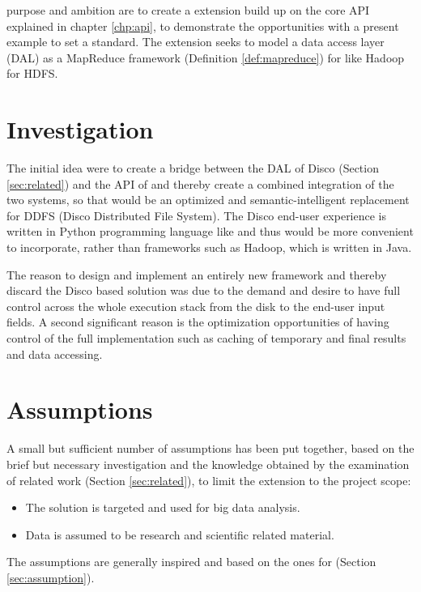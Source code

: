  purpose and ambition are to create a \CodeName extension build up on the core API explained in chapter \ref{chp:api}, to demonstrate the opportunities with a present example to set a standard. The extension seeks to model a data access layer (DAL) as a MapReduce framework (Definition \ref{def:mapreduce}) for \CodeName like Hadoop for HDFS.

\section{Investigation}
The initial idea were to create a bridge between the DAL of Disco (Section \ref{sec:related}) and the API of \CodeName and thereby create a combined integration of the two systems, so that \CodeName would be an optimized and semantic-intelligent replacement for DDFS (Disco Distributed File System). The Disco end-user experience is written in Python programming language like \CodeName and thus would be more convenient to incorporate, rather than frameworks such as Hadoop, which is written in Java.
\newline

The reason to design and implement an entirely new framework and thereby discard the Disco based solution was due to the demand and desire to have full control across the whole execution stack from the disk to the end-user input fields. A second significant reason is the optimization opportunities of having control of the full implementation such as caching of temporary and final results and data accessing.

\section{Assumptions}
A small but sufficient number of assumptions has been put together, based on the brief but necessary investigation and the knowledge obtained by the examination of related work (Section \ref{sec:related}), to limit the extension to the project scope:

\begin{itemize}
	\item The solution is targeted and used for big data analysis.	
	\item Data is assumed to be research and scientific related material. 
\end{itemize}
The assumptions are generally inspired and based on the ones for \CodeName (Section \ref{sec:assumption}).
\newline

